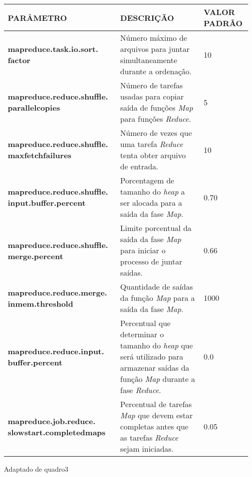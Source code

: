 {\footnotesize
  \centering
  \begin{tabular}{|p{40mm}|p{50mm}|p{30mm}|}\hline
    \textbf{PARÂMETRO}                                      & \textbf{DESCRIÇÃO}                                                                                                                                   & \textbf{VALOR PADRÃO} \\\hline
    \textbf{mapreduce.task.io.sort. factor}                 & Número máximo de arquivos para juntar simultaneamente durante a ordenação.                                                                           & 10                    \\\hline
    \textbf{mapreduce.reduce.shuffle. parallelcopies}       & Número de tarefas usadas para copiar saída de funções \textit{Map} para funções \textit{Reduce}.                                                     & 5                     \\\hline
    \textbf{mapreduce.reduce.shuffle. maxfetchfailures}     & Número de vezes que uma tarefa \textit{Reduce} tenta obter arquivo de entrada.                                                                       & 10                    \\\hline
    \textbf{mapreduce.reduce.shuffle. input.buffer.percent} & Porcentagem de tamanho do \textit{\gls{heap}} a ser alocada para a saída da fase \textit{Map}.                                                             & 0.70                  \\\hline
    \textbf{mapreduce.reduce.shuffle. merge.percent}        & Limite porcentual da saída da fase \textit{Map} para iniciar o processo de juntar saídas.                                                            & 0.66                  \\\hline
    \textbf{mapreduce.reduce.merge. inmem.threshold}        & Quantidade de saídas da função \textit{Map} para a saída da fase \textit{Map}.                                                                       & 1000                  \\\hline
    \textbf{mapreduce.reduce.input. buffer.percent}         & Percentual que determinar o tamanho do \textit{\gls{heap}} que será utilizado para armazenar saídas da função \textit{Map} durante a fase \textit{Reduce}. & 0.0                   \\\hline
    \textbf{mapreduce.job.reduce. slowstart.completedmaps}  & Percentual de tarefas \textit{Map} que devem estar completas antes que as tarefas \textit{Reduce} sejam iniciadas.                                   & 0.05                  \\\hline
  \end{tabular}}
{Adaptado de \cite{HadoopDocs321}}{quadro3}{}{}

